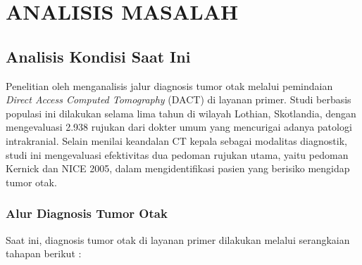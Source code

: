 \cleardoublepage
\chapter{ANALISIS MASALAH}
\label{chap:analisis-masalah}

\section{Analisis Kondisi Saat Ini}

Penelitian oleh \textcite{zienius2019direct} menganalisis jalur diagnosis tumor otak melalui pemindaian \textit{Direct Access Computed Tomography} (DACT) di layanan primer. Studi berbasis populasi ini dilakukan selama lima tahun di wilayah Lothian, Skotlandia, dengan mengevaluasi 2.938 rujukan dari dokter umum yang mencurigai adanya patologi intrakranial. Selain menilai keandalan CT kepala sebagai modalitas diagnostik, studi ini mengevaluasi efektivitas dua pedoman rujukan utama, yaitu pedoman Kernick dan NICE 2005, dalam mengidentifikasi pasien yang berisiko mengidap tumor otak.

\subsection{Alur Diagnosis Tumor Otak}
Saat ini, diagnosis tumor otak di layanan primer dilakukan melalui serangkaian tahapan berikut \cite{zienius2019direct}:

